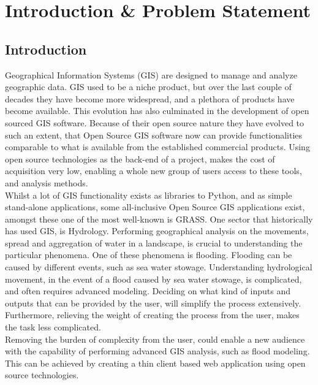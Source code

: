 \chapter{Introduction \& Problem Statement} %
\label{ch:introduction} %


\section{Introduction}

Geographical Information Systems (GIS) are designed to manage and analyze geographic data. GIS used to be a niche product, but  over the last couple of decades they have become more widespread, and a plethora of products have become available. 
This evolution has also culminated in the development of open sourced GIS software. Because of their open source nature they have evolved to such an extent, that Open Source GIS software now can provide functionalities comparable to what is available from the established commercial products. 
Using open source technologies as the back-end of a project, makes the cost of acquisition very low, enabling a whole new group of users access to these tools, and analysis methods. \\

Whilst a lot of GIS functionality exists as libraries to Python, and as simple stand-alone applications, some all-inclusive Open Source GIS applications exist, amongst these one of the most well-known is GRASS.
One sector that historically has used GIS, is Hydrology. Performing geographical analysis on the movements, spread and aggregation of water in a landscape, is crucial to understanding the particular phenomena. One of these phenomena is flooding. Flooding can be caused by different events, such as sea water stowage.
Understanding hydrological movement, in the event of a flood caused by sea water stowage, is complicated, and often requires advanced modeling. Deciding on what kind of inputs and outputs that can be provided by the user, will simplify the process extensively. Furthermore, relieving the weight of creating the process from the user, makes the task less complicated. \\

Removing the burden of complexity from the user, could enable a new audience with the capability of performing advanced GIS analysis, such as flood modeling. This can be achieved by creating a thin client based web application using open source technologies.

